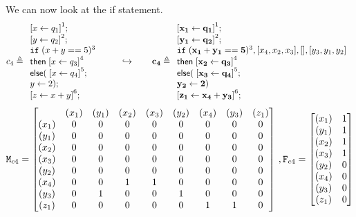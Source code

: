\documentclass[a4paper,11pt]{article}
\begin{document}
We can now look at the if statement.
\[ c_4 \triangleq
\begin{array}{l}
   \left[ x \leftarrow q_1 \right]^1; \\
   \left[y \leftarrow q_2\right]^2 ; \\
    \eif \;( x + y == 5 )^3\; \\
    \mathsf{then} \;\left[ x \leftarrow q_3 \right]^4 \; \\
    \mathsf{else} (\;\left[ x \leftarrow q_4 \right]^5 ; \\
    y \leftarrow 2 ) ;\\
   \left[ z \leftarrow x +y \right]^6; \\
\end{array}
\hspace{20pt} \hookrightarrow \hspace{20pt}
%
 \ssa{c_4} \triangleq
\begin{array}{l}
   \left[ \ssa{ x_1 \leftarrow q_1} \right]^1; \\
   \left[\ssa{ y_1 \leftarrow q_2} \right]^2 ; \\
    \eif \;( \ssa{ x_1 + y_1 == 5} )^3, [ x_4,x_2,x_3 ],[] ,[y_3,y_1,y_2 ]\; \\
    \mathsf{then} \;\left[ \ssa{ x_2 \leftarrow q_3}\right]^4 \; \\
    \mathsf{else} (\;\left[ \ssa{x_3 \leftarrow q_4} \right]^5 ; \\
     \ssa{y_2 \leftarrow 2} ) \\
   \left[ \ssa{ z_1 \leftarrow x_4 +y_3 }\right]^6; \\
\end{array}
\]
\[
\Mtrix_{c4} =  \left[ \begin{matrix}
 & (x_1) & (y_1) & (x_2) & (x_3)  & (y_2) & (x_4) & (y_3) & (z_1)  \\
(x_1) & 0 & 0 & 0 & 0 & 0 & 0 & 0 &0  \\
(y_1) & 0 & 0 & 0 & 0 & 0 & 0 & 0&0\\
(x_2) & 0 & 0 & 0 & 0 & 0 & 0& 0& 0 \\
(x_3) & 0 & 0 & 0 & 0 & 0 & 0 & 0& 0\\
(y_2) & 0 & 0 & 0 & 0 & 0 & 0 & 0 & 0 \\
(x_4) & 0 & 0 & 1 & 1 & 0 & 0 & 0 &0\\
(y_3) & 0 & 1 & 0 & 0 & 1 & 0 & 0 &0\\
(z_1) & 0 & 0 & 0 & 0 & 0 & 1 & 1 & 0  \\
\end{matrix} \right] ~ , 
\flag_{c4} = \left [ \begin{matrix}
(x_1) &  1 \\
(y_1) & 1 \\
(x_2) & 1 \\
(x_3) &  1 \\
(y_2) & 0 \\
(x_4) & 0 \\
(y_3) &  0 \\
(z_1) &  0 \\
\end{matrix} \right ]
\]
%
%
%
%
\end{document}

